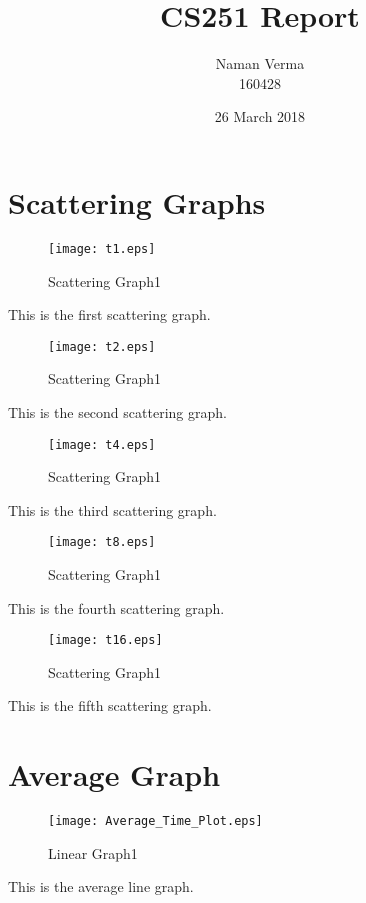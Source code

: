 \documentclass{article}
\title{CS251 Report}
\author{Naman Verma\\ 160428 }
\date{26 March 2018}
\begin{document}
\maketitle

\section{Scattering Graphs}
\begin{figure}[H]
    \centering
    \texttt{[image: t1.eps]}
    \caption{Scattering Graph1}
    \label{fig:my_label}
\end{figure}
This is the first scattering graph.\\

\begin{figure}[H]
    \centering
    \texttt{[image: t2.eps]}
    \caption{Scattering Graph1}
    \label{fig:my_label}
\end{figure}
This is the second scattering graph.\\

\begin{figure}[H]
    \centering
    \texttt{[image: t4.eps]}
    \caption{Scattering Graph1}
    \label{fig:my_label}
\end{figure}
This is the third scattering graph.\\

\begin{figure}[H]
    \centering
    \texttt{[image: t8.eps]}
    \caption{Scattering Graph1}
    \label{fig:my_label}
\end{figure}
This is the fourth scattering graph.\\

\begin{figure}[H]
    \centering
    \texttt{[image: t16.eps]}
    \caption{Scattering Graph1}
    \label{fig:my_label}
\end{figure}
This is the fifth scattering graph.\\

\section{Average Graph}
\begin{figure}[H]
    \centering
    \texttt{[image: Average\_Time\_Plot.eps]}
    \caption{Linear Graph1}
    \label{fig:my_label}
\end{figure}
This is the average line graph.\\
\end{document}
